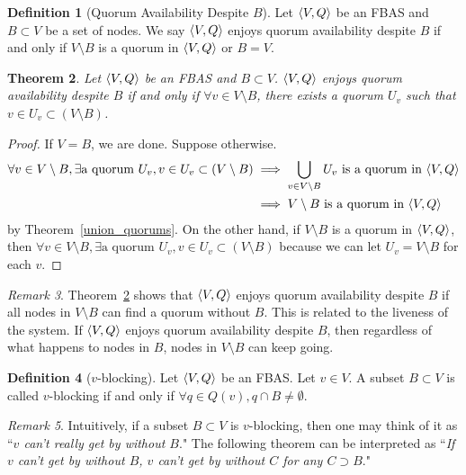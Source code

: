 \documentclass[12pt, psamsfonts]{amsart}
\newtheorem{thm}{Theorem}[subsection]
\theoremstyle{definition}
\newtheorem{defn}[thm]{Definition}
\theoremstyle{remark}
\newtheorem{rem}[thm]{Remark}
\numberwithin{equation}{subsection}
\begin{document}
\begin{defn}[Quorum Availability Despite $B$]\label{def_quorum_availability}
    Let $\ev{V, Q}$ be an FBAS and $B \subset V$ be a set of nodes.
    We say $\ev{V, Q}$ enjoys quorum availability despite $B$ if and only if $V \setminus B$ is a quorum in $\ev{V, Q}$ or $B = V$.
\end{defn}

\begin{thm}\label{quorum_availability_equivalence_condition}
    Let $\ev{V, Q}$ be an FBAS and $B \subset V$.
    $\ev{V, Q}$ enjoys quorum availability despite $B$ if and only if $\forall v \in V \setminus B$, there exists a quorum $U_v$ such that $v \in U_v \subset (V \setminus B)$.
\end{thm}

\begin{proof}
    If $V = B$, we are done.
    Suppose otherwise.
    \begin{align*}
        \forall v \in V \setminus B, \exists \text{a quorum $U_v$}, v \in U_v \subset (V \setminus B)
            &\implies \bigcup_{v \in V \setminus B} U_v \text{ is a quorum in $\ev{V, Q}$} \\
            &\implies \text{$V \setminus B$ is a quorum in $\ev{V, Q}$}
    \end{align*}
    by Theorem~\ref{union_quorums}.
    On the other hand, if $V \setminus B$ is a quorum in $\ev{V, Q}$, then $\forall v \in V \setminus B, \exists \text{a quorum $U_v$}, v \in U_v \subset (V \setminus B)$ because we can let $U_v = V \setminus B$ for each $v$.
\end{proof}

\begin{rem}
    Theorem~\ref{quorum_availability_equivalence_condition} shows that $\ev{V, Q}$ enjoys quorum availability despite $B$ if all nodes in $V \setminus B$ can find a quorum without $B$.
    This is related to the liveness of the system.
    If $\ev{V, Q}$ enjoys quorum availability despite $B$, then regardless of what happens to nodes in $B$, nodes in $V \setminus B$ can keep going.
\end{rem}

\begin{defn}[$v$-blocking]\label{def_v_blocking}
    Let $\ev{V, Q}$ be an FBAS\@.
    Let $v \in V$.
    A subset $B \subset V$ is called $v$-blocking if and only if $\forall q \in Q(v), q \cap B \ne \emptyset$.
\end{defn}

\begin{rem}
    Intuitively, if a subset $B \subset V$ is $v$-blocking, then one may think of it as ``\textit{$v$ can't really get by without $B$}."
    The following theorem can be interpreted as ``\textit{If $v$ can't get by without $B$, $v$ can't get by without $C$ for any $C \supset B$}."
\end{rem}
\end{document}
